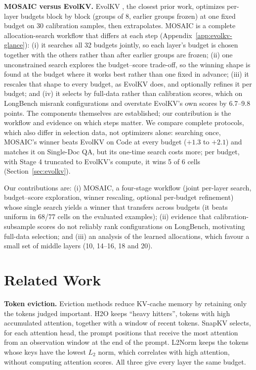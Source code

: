 \documentclass[11pt]{article}
\begin{document}
\textbf{MOSAIC versus EvolKV.}\label{sec:intro-evolkv} EvolKV \citep{yu2025evolkv}, the closest prior work, optimizes per-layer budgets block by block (groups of 8, earlier groups frozen) at one fixed budget on 30 calibration samples, then extrapolates. MOSAIC is a complete allocation-search workflow that differs at each step (Appendix~\ref{app:evolkv-glance}): (i) it searches all 32 budgets jointly, so each layer's budget is chosen together with the others rather than after earlier groups are frozen; (ii) one unconstrained search explores the budget--score trade-off, so the winning shape is found at the budget where it works best rather than one fixed in advance; (iii) it rescales that shape to every budget, as EvolKV does, and optionally refines it per budget; and (iv) it selects by full-data rather than calibration scores, which on LongBench misrank configurations and overstate EvolKV's own scores by 6.7--9.8 points. The components themselves are established; our contribution is the workflow and evidence on which steps matter. We compare complete protocols, which also differ in selection data, not optimizers alone: searching once, MOSAIC's winner beats EvolKV on Code at every budget ($+1.3$ to $+2.1$) and matches it on Single-Doc QA, but its one-time search costs more; per budget, with Stage 4 truncated to EvolKV's compute, it wins 5 of 6 cells (Section~\ref{sec:evolkv}).

Our contributions are: (i) MOSAIC, a four-stage workflow (joint per-layer search, budget--score exploration, winner rescaling, optional per-budget refinement) whose single search yields a winner that transfers across budgets (it beats uniform in 68/77 cells on the evaluated examples); (ii) evidence that calibration-subsample scores do not reliably rank configurations on LongBench, motivating full-data selection; and (iii) an analysis of the learned allocations, which favour a small set of middle layers (10, 14--16, 18 and 20).

\section{Related Work}

\textbf{Token eviction.} Eviction methods reduce KV-cache memory by retaining only the tokens judged important. H2O \citep{zhang2023h2o} keeps ``heavy hitters'', tokens with high accumulated attention, together with a window of recent tokens. SnapKV \citep{li2024snapkv} selects, for each attention head, the prompt positions that receive the most attention from an observation window at the end of the prompt. L2Norm \citep{devoto2024l2norm} keeps the tokens whose keys have the lowest $L_2$ norm, which correlates with high attention, without computing attention scores. All three give every layer the same budget.
\end{document}
